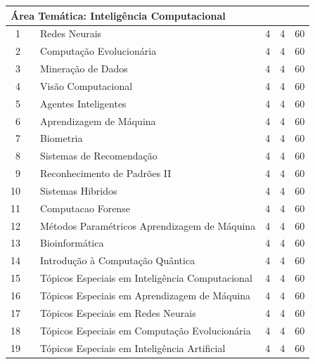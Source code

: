 \documentclass[
	12pt,				%
	openright,			%
  oneside,     %
	a4paper,			%
	chapter=TITLE,		%
	english,			%
	french,				%
	spanish,			%
	brazil				%
	]{abntex2}
\begin{document}
\begin{apendicesenv}
\begin{longtable}{r|r|l|r|r|r}
\multicolumn{6}{l}{\textbf{Área Temática: Inteligência Computacional} }  \\ \hline
    1     &       & Redes Neurais & 4     & 4     & 60 \\ \hline
    2     &       & Computação Evolucionária & 4     & 4     & 60 \\ \hline
    3     &       & Mineração de Dados & 4     & 4     & 60 \\ \hline
    4     &       & Visão Computacional & 4     & 4     & 60 \\ \hline
    5     &       & Agentes Inteligentes & 4     & 4     & 60 \\ \hline
    6     &       & Aprendizagem de Máquina & 4     & 4     & 60 \\ \hline
    7     &       & Biometria & 4     & 4     & 60 \\ \hline
    8     &       & Sistemas de Recomendação & 4     & 4     & 60 \\ \hline
    9     &       & Reconhecimento de Padrões II & 4     & 4     & 60 \\ \hline
    10    &       & Sistemas Hibridos & 4     & 4     & 60 \\ \hline
    11    &       & Computacao Forense & 4     & 4     & 60 \\ \hline
    12    &       & \small{Métodos Paramétricos Aprendizagem de Máquina} & 4     & 4     & 60 \\ \hline
    13    &       & Bioinformática & 4     & 4     & 60 \\ \hline
    14    &       & Introdução à Computação Quântica & 4    & 4 & 60 \\ \hline 
    15    &       & \small{Tópicos Especiais em Inteligência Computacional} & 4     & 4     & 60 \\ \hline
    16    &       & \small{Tópicos Especiais em Aprendizagem de Máquina} & 4     & 4     & 60 \\ \hline
    17    &       & \small{Tópicos Especiais em Redes Neurais} & 4     & 4     & 60 \\ \hline
    18    &       & \small{Tópicos Especiais em Computação Evolucionária} & 4     & 4     & 60 \\ \hline
    19    &       & \small{Tópicos Especiais em Inteligência Artificial} & 4     & 4     & 60 \\ \hline


\end{longtable}
\end{apendicesenv}
\end{document}
